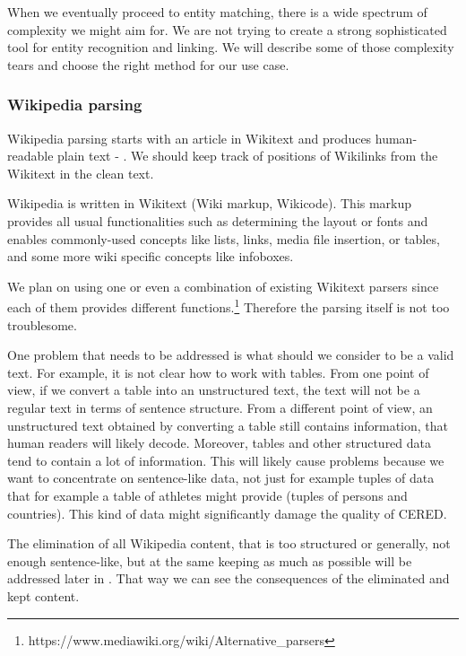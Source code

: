 When we eventually proceed to entity matching, there is a wide spectrum of complexity we might aim for. We are not trying to create a strong sophisticated tool for entity recognition and linking. We will describe some of those complexity tears and choose the right method for our use case.



 

\subsubsection{Wikipedia parsing}
\label{sec:wikipedia_parsing_analysis}
Wikipedia parsing starts with an article in Wikitext and produces human-readable plain text - . We should keep track of positions of Wikilinks from the Wikitext in the clean text.

Wikipedia is written in Wikitext (Wiki markup, Wikicode). This markup provides all usual functionalities such as determining the layout or fonts and enables commonly-used concepts like lists, links, media file insertion, or tables, and some more wiki specific concepts like infoboxes.

We plan on using one or even a combination of existing Wikitext parsers since each of them provides different functions.\footnote{https://www.mediawiki.org/wiki/Alternative\_parsers} Therefore the parsing itself is not too troublesome. 

One problem that needs to be addressed is what should we consider to be a valid text. For example, it is not clear how to work with tables. From one point of view, if we convert a table into an unstructured text, the text will not be a regular text in terms of sentence structure. From a different point of view, an unstructured text obtained by converting a table still contains information, that human readers will likely decode. Moreover, tables and other structured data tend to contain a lot of information. This will likely cause problems because we want to concentrate on sentence-like data, not just for example tuples of data that for example a table of athletes might provide (tuples of persons and countries). This kind of data might significantly damage the quality of CERED.

The elimination of all Wikipedia content, that is too structured or generally, not enough sentence-like, but at the same keeping as much as possible will be addressed later in . That way we can see the consequences of the eliminated and kept content.


